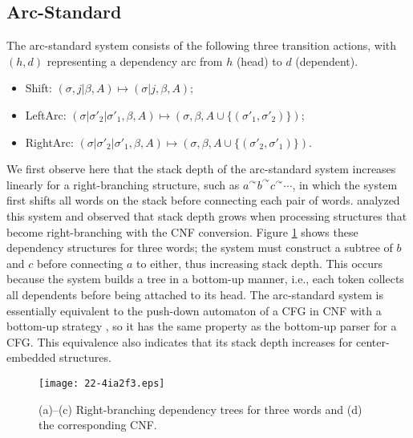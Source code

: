 \documentclass[english]{jnlp_1.4}
\begin{document}
\subsection{Arc-Standard}
\label{sec:standard}

The arc-standard system \cite{nivre:2004:IncrementalParsing} consists of the following three transition actions, with $(h, d)$ representing a dependency arc from $h$ (head) to $d$ (dependent).
\begin{itemize}
 \item {\sc Shift}: $(\sigma,j|\beta,A) \mapsto (\sigma | j, \beta, A)$;
 \item {\sc LeftArc}: $(\sigma|\sigma'_2|\sigma'_1, \beta, A) \mapsto (\sigma, \beta, A \cup \{ (\sigma'_1, \sigma'_2) \})$;
 \item {\sc RightArc}: $(\sigma|\sigma'_2|\sigma'_1, \beta, A) \mapsto (\sigma, \beta, A \cup \{ (\sigma'_2, \sigma'_1) \})$.
\end{itemize}

We first observe here that the stack depth of the arc-standard system increases linearly for a right-branching structure, such as $a^\curvearrowright b^\curvearrowright c^\curvearrowright \cdots$, in which the system first shifts all words on the stack before connecting each pair of words.
 analyzed this system and observed that stack depth grows when processing structures that become right-branching with the CNF conversion.
Figure \ref{fig:right-deps} shows these dependency structures for three words;
the system must construct a subtree of $b$ and $c$ before connecting $a$ to either, thus increasing stack depth.
This occurs because the system builds a tree in a bottom-up manner, i.e., each token collects all dependents before being attached to its head.
The arc-standard system is essentially equivalent to the push-down automaton of a CFG in CNF with a bottom-up strategy \cite{nivre:2004:IncrementalParsing}, so it has the same property as the bottom-up parser for a CFG.
This equivalence also indicates that its stack depth increases for center-embedded structures.

\begin{figure}[b]
\begin{center}
\texttt{[image: 22-4ia2f3.eps]}
\end{center}
\caption{(a)--(c) Right-branching dependency trees for three words and (d) the corresponding CNF.}
\label{fig:right-deps}
\end{figure}
\end{document}
